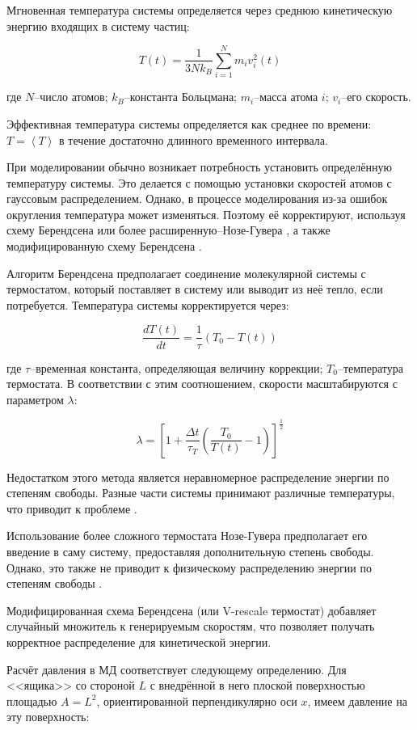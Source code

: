 Мгновенная температура системы определяется через среднюю кинетическую энергию входящих в систему частиц:

\[
T(t) = {\frac{1}{3 N k_B}} \sum_{i=1}^N {m_i v_i^2(t)}
\]

где $N$--число атомов; $k_B$--константа Больцмана; $m_i$--масса атома $i$; $v_i$--его скорость. 

Эффективная температура системы определяется как среднее по времени: $T = \left \langle T \right \rangle$ в течение достаточно длинного временного интервала.

При моделировании обычно возникает потребность установить определённую температуру системы. Это делается с помощью установки скоростей атомов с гауссовым распределением. Однако, в процессе моделирования из-за ошибок округления температура может изменяться. Поэтому её корректируют, используя схему Берендсена \cite{Berendsen1984} или более расширенную--Нозе-Гувера \cite{Nose1984,Hoover1985}, а также модифицированную схему Берендсена \cite{Bussi2007}.

Алгоритм Берендсена предполагает соединение молекулярной системы с термостатом, который поставляет в систему или выводит из неё тепло, если потребуется. Температура системы корректируется через:

\[
{\frac{dT(t)}{dt}} = {\frac{1}{\tau}} (T_0 - T(t))
\]

где $\tau$--временная константа, определяющая величину коррекции; $T_0$--температура термостата.
В соответствии с этим соотношением, скорости масштабируются с параметром $\lambda$:

\[
\lambda = \left [1 + {\frac{\Delta t}{\tau_T}} \left ( {\frac{T_0}{T(t)}} - 1 \right ) \right ]^{\frac{1}{2}}
\]

Недостатком этого метода является неравномерное распределение энергии по степеням свободы. Разные части системы принимают различные температуры, что приводит к проблеме \cite{Harvey1998}. 

Использование более сложного термостата Нозе-Гувера предполагает его введение в саму систему, предоставляя дополнительную степень свободы. Однако, это также не приводит к физическому распределению энергии по степеням свободы \cite{Golo2004}.

Модифицированная схема Берендсена (или V-rescale термостат) добавляет случайный множитель к генерируемым скоростям, что позволяет получать корректное распределение для кинетической энергии.

Расчёт давления в МД соответствует следующему определению. Для <<ящика>> со стороной $L$ с внедрённой в него плоской поверхностью площадью $A = L^2$, ориентированной перпендикулярно оси $x$, имеем давление на эту поверхность:

